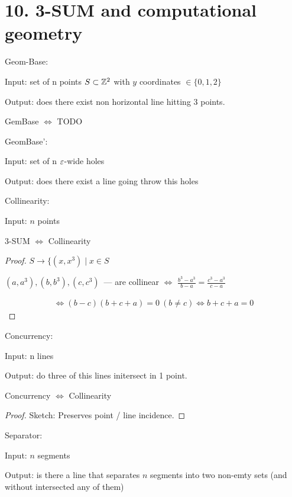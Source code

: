 \section{10. 3-SUM and computational geometry}

\begin{lm}

	Geom-Base:

	Input: set of n points $S \subset \mathbb{Z}^2$ with $y$ coordinates $\in \{0,1,2\}$ 

	Output: does there exist non horizontal line hitting 3 points.

\end{lm}

\begin{lm}
	GemBase $\Leftrightarrow$ {\color{red} TODO}
\end{lm}


GeomBase':

Input: set of n $\varepsilon$-wide holes 

Output: does there exist a line going throw this holes 


Collinearity:

Input: $n$ points 


\begin{lm}
	3-SUM $\Leftrightarrow$ Collinearity
\end{lm}

\begin{proof}
	$S \to \{(x, x^3) \mid x \in S$

		$(a, a^3), (b, b^3), (c, c^3)$~--- are collinear $\Leftrightarrow$ $\frac{b^3 - a^3}{b - a} = \frac{c^3 - a^3}{c - a}$

		\begin{align*}
			\Leftrightarrow (b - c) (b + c + a) = 0 \ (b \ne c) \Leftrightarrow b + c + a = 0
		\end{align*}
\end{proof}

Concurrency:

Input: n lines 

Output: do three of this lines initersect in 1 point.

\begin{lm}
	Concurrency $\Leftrightarrow$ Collinearity
\end{lm}

\begin{proof}
	Sketch:
	Preserves point / line incidence.
\end{proof}

\begin{df}
Separator:

Input: $n$ segments

Output: is there a line that separates $n $ segments into two non-emty sets (and without intersected any of them)

\end{df}

